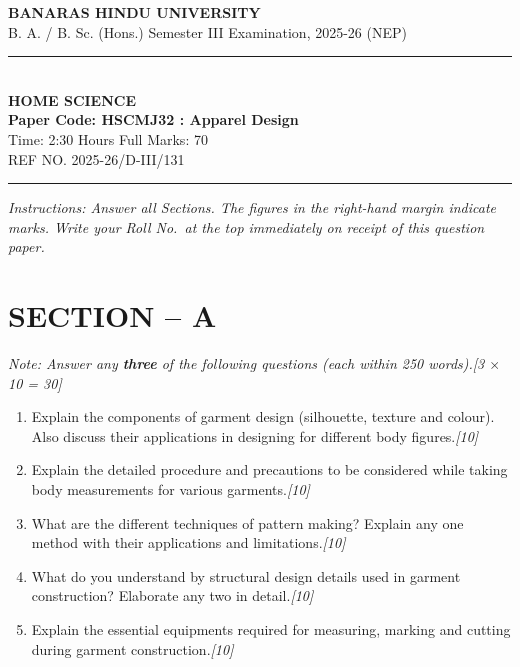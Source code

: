 \documentclass[11pt,a4paper]{article}
\newcommand{\pts}[1]{\hfill \textit{[#1]}}
\begin{document}
\begin{center}
  {\large\bfseries BANARAS HINDU UNIVERSITY}\\[2pt]
  {\normalsize B. A. / B. Sc. (Hons.) Semester III Examination, 2025-26 (NEP)}\\[6pt]
  \rule{0.8\linewidth}{0.5pt}\\[6pt]
  {\large\bfseries HOME SCIENCE}\\[4pt]
  {\large\bfseries Paper Code: HSCMJ32 : Apparel Design}\\[4pt]
  {\normalsize Time: 2:30 Hours \hfill Full Marks: 70}\\[2pt]
  {\small REF NO. 2025-26/D-III/131}
\end{center}
\rule{\linewidth}{0.4pt}
\smallskip

\noindent \textit{Instructions: Answer all Sections. The figures in the right-hand margin indicate marks. Write your Roll No.\ at the top immediately on receipt of this question paper.}

\bigskip

\section*{SECTION -- A}
\noindent \textit{Note: Answer any \textbf{three} of the following questions (each within 250 words).}\pts{3 $\times$ 10 = 30}

\begin{enumerate}[label=\textbf{\arabic*.},leftmargin=*,itemsep=10pt]

  \item Explain the components of garment design (silhouette, texture and colour). Also discuss their applications in designing for different body figures.\pts{10}

  \item Explain the detailed procedure and precautions to be considered while taking body measurements for various garments.\pts{10}

  \item What are the different techniques of pattern making? Explain any one method with their applications and limitations.\pts{10}

  \item What do you understand by structural design details used in garment construction? Elaborate any two in detail.\pts{10}

  \item Explain the essential equipments required for measuring, marking and cutting during garment construction.\pts{10}

\end{enumerate}
\end{document}

